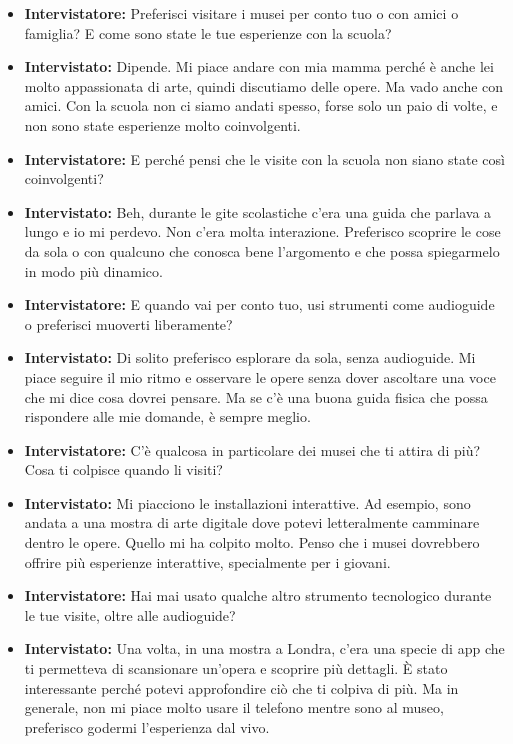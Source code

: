\documentclass{article}
\begin{document}
\begin{itemize}
    \item \textbf{Intervistatore:} Preferisci visitare i musei per conto tuo o con amici o famiglia? E come sono state le tue esperienze con la scuola?

    \item \textbf{Intervistato:} Dipende. Mi piace andare con mia mamma perché è anche lei molto appassionata di arte, quindi discutiamo delle opere. Ma vado anche con amici. Con la scuola non ci siamo andati spesso, forse solo un paio di volte, e non sono state esperienze molto coinvolgenti.

    \item \textbf{Intervistatore:} E perché pensi che le visite con la scuola non siano state così coinvolgenti?

    \item \textbf{Intervistato:} Beh, durante le gite scolastiche c’era una guida che parlava a lungo e io mi perdevo. Non c’era molta interazione. Preferisco scoprire le cose da sola o con qualcuno che conosca bene l’argomento e che possa spiegarmelo in modo più dinamico.

    \item \textbf{Intervistatore:} E quando vai per conto tuo, usi strumenti come audioguide o preferisci muoverti liberamente?

    \item \textbf{Intervistato:} Di solito preferisco esplorare da sola, senza audioguide. Mi piace seguire il mio ritmo e osservare le opere senza dover ascoltare una voce che mi dice cosa dovrei pensare. Ma se c'è una buona guida fisica che possa rispondere alle mie domande, è sempre meglio.

    \item \textbf{Intervistatore:} C’è qualcosa in particolare dei musei che ti attira di più? Cosa ti colpisce quando li visiti?

    \item \textbf{Intervistato:} Mi piacciono le installazioni interattive. Ad esempio, sono andata a una mostra di arte digitale dove potevi letteralmente camminare dentro le opere. Quello mi ha colpito molto. Penso che i musei dovrebbero offrire più esperienze interattive, specialmente per i giovani.

    \item \textbf{Intervistatore:} Hai mai usato qualche altro strumento tecnologico durante le tue visite, oltre alle audioguide?

    \item \textbf{Intervistato:} Una volta, in una mostra a Londra, c'era una specie di app che ti permetteva di scansionare un’opera e scoprire più dettagli. È stato interessante perché potevi approfondire ciò che ti colpiva di più. Ma in generale, non mi piace molto usare il telefono mentre sono al museo, preferisco godermi l’esperienza dal vivo.


\end{itemize}
\end{document}

